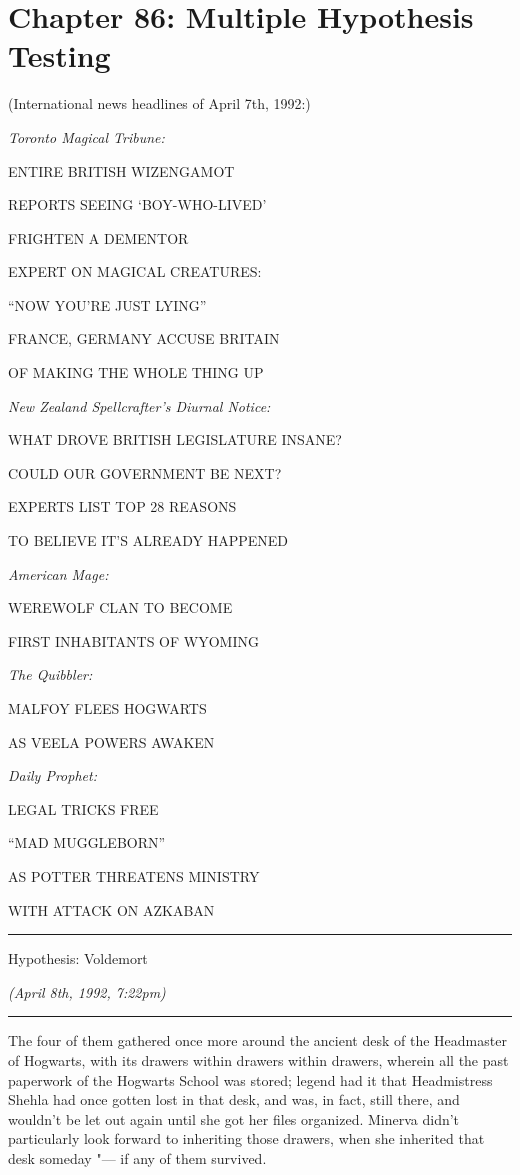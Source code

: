\chapter{Chapter 86: Multiple Hypothesis Testing}
(International news headlines of April 7th, 1992:)

\emph{Toronto Magical Tribune:}

ENTIRE BRITISH WIZENGAMOT

REPORTS SEEING `BOY-WHO-LIVED'

FRIGHTEN A DEMENTOR

EXPERT ON MAGICAL CREATURES:

``NOW YOU'RE JUST LYING''

FRANCE, GERMANY ACCUSE BRITAIN

OF MAKING THE WHOLE THING UP

\emph{New Zealand Spellcrafter's Diurnal Notice:}

WHAT DROVE BRITISH LEGISLATURE INSANE?

COULD OUR GOVERNMENT BE NEXT?

EXPERTS LIST TOP 28 REASONS

TO BELIEVE IT'S ALREADY HAPPENED

\emph{American Mage:}

WEREWOLF CLAN TO BECOME

FIRST INHABITANTS OF WYOMING

\emph{The Quibbler:}

MALFOY FLEES HOGWARTS

AS VEELA POWERS AWAKEN

\emph{Daily Prophet:}

LEGAL TRICKS FREE

``MAD MUGGLEBORN''

AS POTTER THREATENS MINISTRY

WITH ATTACK ON AZKABAN

\begin{center}\rule{3in}{0.4pt}\end{center}

Hypothesis: Voldemort

\emph{(April 8th, 1992, 7:22pm)}

\begin{center}\rule{3in}{0.4pt}\end{center}

The four of them gathered once more around the ancient desk of the
Headmaster of Hogwarts, with its drawers within drawers within drawers,
wherein all the past paperwork of the Hogwarts School was stored; legend
had it that Headmistress Shehla had once gotten lost in that desk, and
was, in fact, still there, and wouldn't be let out again until she got
her files organized. Minerva didn't particularly look forward to
inheriting those drawers, when she inherited that desk someday "--- if any
of them survived.

